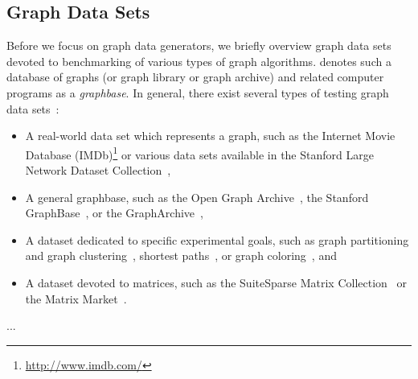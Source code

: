 \subsection{Graph Data Sets}

Before we focus on graph data generators, we briefly overview graph data sets devoted to benchmarking of various types of graph algorithms. \cite{Knuth:1993:SGP:164984} denotes such a  database of graphs (or graph library or graph archive) and related computer programs as a \emph{graphbase}. In general, there exist several types of testing graph data sets~\cite{Bachmaier2012}:

\begin{itemize}
  \item A real-world data set which represents a graph, such as the Internet Movie Database (IMDb)\footnote{\url{http://www.imdb.com/}} or various data sets available in the Stanford Large Network Dataset Collection~\cite{snapnets},
  \item A general graphbase, such as the Open Graph Archive~\cite{Bachmaier2012}, the Stanford GraphBase~\cite{Knuth:1993:SGP:164984}, or the GraphArchive~\cite{GraphArchive},
  \item A dataset dedicated to specific experimental goals, such as graph partitioning and graph clustering~\cite{10dimacs}, shortest paths~\cite{9dimacs}, or graph coloring~\cite{coloring}, and
  \item A dataset devoted to matrices, such as the SuiteSparse Matrix Collection~\cite{SuiteSparse} or  the Matrix Market~\cite{MatrixMarket}.
\end{itemize}


...